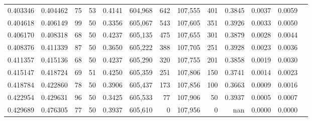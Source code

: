 \begin{tabular}{rrrrrrrrrrrrr}
0.403346 & 0.404462 &    75 &  53 &                                     0.4141 & 604,968 &     642 & 107,555 &     401 & 0.3845 & 0.0037 & 0.0059 \\
0.404618 & 0.406149 &    99 &  50 &                                     0.3356 & 605,067 &     543 & 107,605 &     351 & 0.3926 & 0.0033 & 0.0050 \\
0.406170 & 0.408318 &    68 &  50 &                                     0.4237 & 605,135 &     475 & 107,655 &     301 & 0.3879 & 0.0028 & 0.0044 \\
0.408376 & 0.411339 &    87 &  50 &                                     0.3650 & 605,222 &     388 & 107,705 &     251 & 0.3928 & 0.0023 & 0.0036 \\
0.411357 & 0.415136 &    68 &  50 &                                     0.4237 & 605,290 &     320 & 107,755 &     201 & 0.3858 & 0.0019 & 0.0030 \\
0.415147 & 0.418724 &    69 &  51 &                                     0.4250 & 605,359 &     251 & 107,806 &     150 & 0.3741 & 0.0014 & 0.0023 \\
0.418784 & 0.422860 &    78 &  50 &                                     0.3906 & 605,437 &     173 & 107,856 &     100 & 0.3663 & 0.0009 & 0.0016 \\
0.422954 & 0.429631 &    96 &  50 &                                     0.3425 & 605,533 &      77 & 107,906 &      50 & 0.3937 & 0.0005 & 0.0007 \\
0.429689 & 0.476305 &    77 &  50 &                                     0.3937 & 605,610 &       0 & 107,956 &       0 &    nan & 0.0000 & 0.0000 \\
\bottomrule
\end{tabular}
